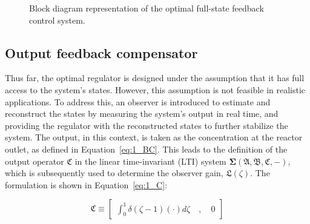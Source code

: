 \begin{figure}[!htbp]
    \centering
    \caption{Block diagram representation of the optimal full-state feedback control system.}
    \label{fig:1_block_diagram}
\end{figure}

\subsection{Output feedback compensator} \label{sec:1_output_design}

Thus far, the optimal regulator is designed under the assumption that it has full access to the system's states. However, this assumption is not feasible in realistic applications. To address this, an observer is introduced to estimate and reconstruct the states by measuring the system's output in real time, and providing the regulator with the reconstructed states to further stabilize the system. The output, in this context, is taken as the concentration at the reactor outlet, as defined in Equation~\ref{eq:1_BC}. This leads to the definition of the output operator $\mathfrak{C}$ in the linear time-invariant (LTI) system $\mathbf{\Sigma(\mathfrak{A},\mathfrak{B},\mathfrak{C},-)}$, which is subsequently used to determine the observer gain, $\mathfrak{L}(\zeta)$. The formulation is shown in Equation~\ref{eq:1_C}:

\begin{equation} \label{eq:1_C}
    \mathfrak{C} \equiv \begin{bmatrix}
        \int_0^1 \delta(\zeta-1) ( \cdot ) d\zeta \quad , \quad 0
    \end{bmatrix}
\end{equation}

